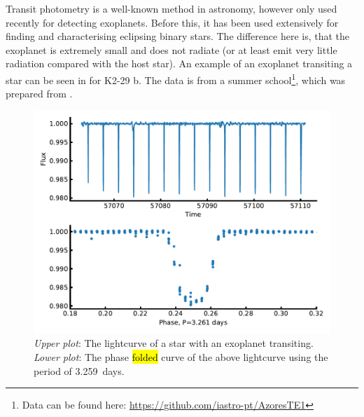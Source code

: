 Transit photometry is a well-known method in astronomy, however only used recently for detecting
exoplanets. Before this, it has been used extensively for finding and characterising eclipsing
binary stars. The difference here is, that the exoplanet is extremely small and does not radiate (or
at least emit very little radiation compared with the host star). An example of an exoplanet
transiting a star can be seen in  for K2-29 b. The data is from a summer
school\footnote{Data can be found here: \url{https://github.com/iastro-pt/AzoresTE1}}, which was
prepared from \citet{Santerne2016}.

\begin{figure}[htpb!]
    \centering
    \includegraphics[width=1.0\linewidth]{figures/transitMethod.pdf}
    \caption{\emph{Upper plot}: The lightcurve of a star with an exoplanet transiting.
             \emph{Lower plot}: The phase \hl{folded} curve of the above lightcurve using the period
             of \SI{3.259}{days}.}
    \label{fig:transitMethod}
\end{figure}

